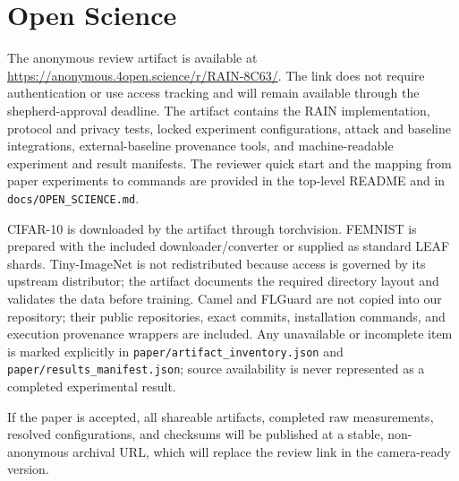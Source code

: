 \section{Open Science}
\label{app:open-science}

The anonymous review artifact is available at
\url{https://anonymous.4open.science/r/RAIN-8C63/}. The link does not require authentication or
use access tracking and will remain available through the shepherd-approval
deadline. The artifact contains the RAIN implementation, protocol and privacy
tests, locked experiment configurations, attack and baseline integrations,
external-baseline provenance tools, and machine-readable experiment and result
manifests. The reviewer quick start and the mapping from paper experiments to
commands are provided in the top-level README and in
\texttt{docs/OPEN\_SCIENCE.md}.

CIFAR-10 is downloaded by the artifact through torchvision. FEMNIST is prepared
with the included downloader/converter or supplied as standard LEAF shards.
Tiny-ImageNet is not redistributed because access is governed by its upstream
distributor; the artifact documents the required directory layout and validates
the data before training. Camel and FLGuard are not copied into our repository;
their public repositories, exact commits, installation commands, and execution
provenance wrappers are included. Any unavailable or incomplete item is marked
explicitly in \texttt{paper/artifact\_inventory.json} and
\texttt{paper/results\_manifest.json}; source availability is never represented
as a completed experimental result.

If the paper is accepted, all shareable artifacts, completed raw measurements,
resolved configurations, and checksums will be published at a stable,
non-anonymous archival URL, which will replace the review link in the
camera-ready version.
